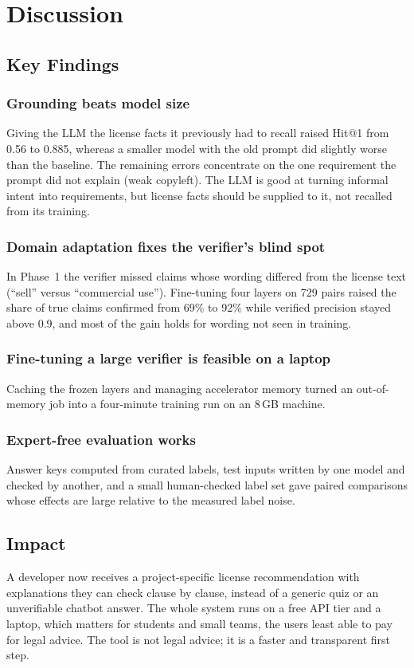 \section{Discussion}
\label{s:discussion}

\subsection{Key Findings}

\subsubsection{Grounding beats model size}
Giving the LLM the license facts it previously had to recall raised Hit@1 from 0.56 to 0.885, whereas a smaller model with the old prompt did slightly worse than the baseline. The remaining errors concentrate on the one requirement the prompt did not explain (weak copyleft). The LLM is good at turning informal intent into requirements, but license facts should be supplied to it, not recalled from its training.

\subsubsection{Domain adaptation fixes the verifier's blind spot}
In Phase~1 the verifier missed claims whose wording differed from the license text (``sell'' versus ``commercial use''). Fine-tuning four layers on 729 pairs raised the share of true claims confirmed from 69\% to 92\% while verified precision stayed above 0.9, and most of the gain holds for wording not seen in training.

\subsubsection{Fine-tuning a large verifier is feasible on a laptop}
Caching the frozen layers and managing accelerator memory turned an out-of-memory job into a four-minute training run on an 8\,GB machine.

\subsubsection{Expert-free evaluation works}
Answer keys computed from curated labels, test inputs written by one model and checked by another, and a small human-checked label set gave paired comparisons whose effects are large relative to the measured label noise.

\subsection{Impact}
A developer now receives a project-specific license recommendation with explanations they can check clause by clause, instead of a generic quiz or an unverifiable chatbot answer. The whole system runs on a free API tier and a laptop, which matters for students and small teams, the users least able to pay for legal advice. The tool is not legal advice; it is a faster and transparent first step.

